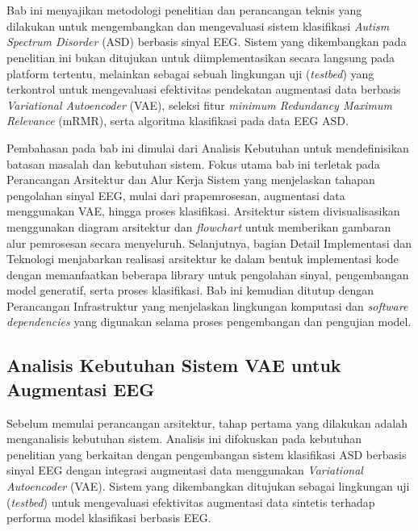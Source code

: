 \chapter{\babTiga}
\label{cha:Perancangan Dan Implementasi Sistem}
Bab ini menyajikan metodologi penelitian dan perancangan teknis yang dilakukan untuk mengembangkan dan mengevaluasi sistem klasifikasi \textit{Autism Spectrum Disorder} (ASD) berbasis sinyal EEG. Sistem yang dikembangkan pada penelitian ini bukan ditujukan untuk diimplementasikan secara langsung pada platform tertentu, melainkan sebagai sebuah lingkungan uji (\textit{testbed}) yang terkontrol untuk mengevaluasi efektivitas pendekatan augmentasi data berbasis \textit{Variational Autoencoder} (VAE), seleksi fitur \textit{minimum Redundancy Maximum Relevance} (mRMR), serta algoritma klasifikasi pada data EEG ASD.

Pembahasan pada bab ini dimulai dari Analisis Kebutuhan untuk mendefinisikan batasan masalah dan kebutuhan sistem. Fokus utama bab ini terletak pada Perancangan Arsitektur dan Alur Kerja Sistem yang menjelaskan tahapan pengolahan sinyal EEG, mulai dari prapemrosesan, augmentasi data menggunakan VAE, hingga proses klasifikasi. Arsitektur sistem divisualisasikan menggunakan diagram arsitektur dan \textit{flowchart} untuk memberikan gambaran alur pemrosesan secara menyeluruh. Selanjutnya, bagian Detail Implementasi dan Teknologi menjabarkan realisasi arsitektur ke dalam bentuk implementasi kode dengan memanfaatkan beberapa library untuk pengolahan sinyal, pengembangan model generatif, serta proses klasifikasi. Bab ini kemudian ditutup dengan Perancangan Infrastruktur yang menjelaskan lingkungan komputasi dan \textit{software dependencies} yang digunakan selama proses pengembangan dan pengujian model.

\section{Analisis Kebutuhan Sistem VAE untuk Augmentasi EEG}

Sebelum memulai perancangan arsitektur, tahap pertama yang dilakukan adalah menganalisis kebutuhan sistem. Analisis ini difokuskan pada kebutuhan penelitian yang berkaitan dengan pengembangan sistem klasifikasi ASD berbasis sinyal EEG dengan integrasi augmentasi data menggunakan \textit{Variational Autoencoder} (VAE). Sistem yang dikembangkan ditujukan sebagai lingkungan uji (\textit{testbed}) untuk mengevaluasi efektivitas augmentasi data sintetis terhadap performa model klasifikasi berbasis EEG.

